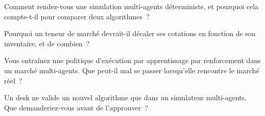 \begin{interviewq}\label{iq:mx:build-an-agent-based-market:3}
Comment rendez-vous une simulation multi-agents déterministe, et pourquoi cela compte-t-il pour comparer deux algorithmes~?
\end{interviewq}

\begin{interviewq}\label{iq:mx:build-an-agent-based-market:4}
Pourquoi un teneur de marché devrait-il décaler ses cotations en fonction de son inventaire, et de combien~?
\end{interviewq}

\begin{interviewq}\label{iq:mx:build-an-agent-based-market:5}
Vous entraînez une politique d'exécution par apprentissage par renforcement dans un marché multi-agents. Que peut-il mal se passer lorsqu'elle rencontre le marché réel~?
\end{interviewq}

\begin{interviewq}\label{iq:mx:build-an-agent-based-market:6}
Un desk ne valide un nouvel algorithme que dans un simulateur multi-agents. Que demanderiez-vous avant de l'approuver~?
\end{interviewq}

